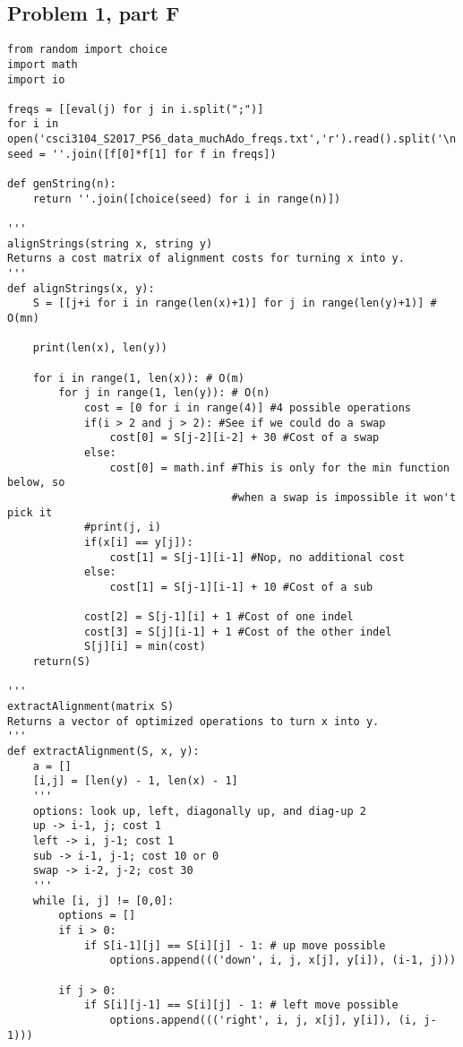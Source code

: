 \documentclass[12pt]{article}
\begin{document}
\subsection{Problem 1, part F}
\begin{Verbatim}[fontsize=\small]
from random import choice
import math
import io

freqs = [[eval(j) for j in i.split(";")]
for i in open('csci3104_S2017_PS6_data_muchAdo_freqs.txt','r').read().split('\n')]
seed = ''.join([f[0]*f[1] for f in freqs])

def genString(n):
    return ''.join([choice(seed) for i in range(n)])

'''
alignStrings(string x, string y)
Returns a cost matrix of alignment costs for turning x into y.
'''
def alignStrings(x, y):
    S = [[j+i for i in range(len(x)+1)] for j in range(len(y)+1)] # O(mn)

    print(len(x), len(y))

    for i in range(1, len(x)): # O(m)
        for j in range(1, len(y)): # O(n)
            cost = [0 for i in range(4)] #4 possible operations
            if(i > 2 and j > 2): #See if we could do a swap
                cost[0] = S[j-2][i-2] + 30 #Cost of a swap
            else:
                cost[0] = math.inf #This is only for the min function below, so
                                   #when a swap is impossible it won't pick it
            #print(j, i)
            if(x[i] == y[j]):
                cost[1] = S[j-1][i-1] #Nop, no additional cost
            else:
                cost[1] = S[j-1][i-1] + 10 #Cost of a sub

            cost[2] = S[j-1][i] + 1 #Cost of one indel
            cost[3] = S[j][i-1] + 1 #Cost of the other indel
            S[j][i] = min(cost)
    return(S)

'''
extractAlignment(matrix S)
Returns a vector of optimized operations to turn x into y.
'''
def extractAlignment(S, x, y):
    a = []
    [i,j] = [len(y) - 1, len(x) - 1]
    '''
    options: look up, left, diagonally up, and diag-up 2
    up -> i-1, j; cost 1
    left -> i, j-1; cost 1
    sub -> i-1, j-1; cost 10 or 0
    swap -> i-2, j-2; cost 30
    '''
    while [i, j] != [0,0]:
        options = []
        if i > 0:
            if S[i-1][j] == S[i][j] - 1: # up move possible
                options.append((('down', i, j, x[j], y[i]), (i-1, j)))

        if j > 0:
            if S[i][j-1] == S[i][j] - 1: # left move possible
                options.append((('right', i, j, x[j], y[i]), (i, j-1)))


\end{Verbatim}
\end{document}
